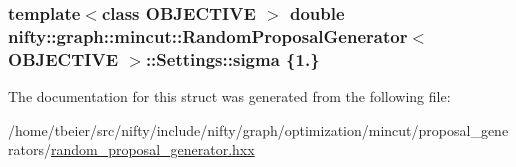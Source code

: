 \subsubsection[{sigma}]{\setlength{\rightskip}{0pt plus 5cm}template$<$class O\+B\+J\+E\+C\+T\+I\+V\+E $>$ double {\bf nifty\+::graph\+::mincut\+::\+Random\+Proposal\+Generator}$<$ O\+B\+J\+E\+C\+T\+I\+V\+E $>$\+::Settings\+::sigma \{1.\}}\label{structnifty_1_1graph_1_1mincut_1_1RandomProposalGenerator_1_1Settings_a457e00b5b4127dea774c5579b7a6ee96}


The documentation for this struct was generated from the following file\+:\begin{DoxyCompactItemize}
\item 
/home/tbeier/src/nifty/include/nifty/graph/optimization/mincut/proposal\+\_\+generators/\hyperlink{random__proposal__generator_8hxx}{random\+\_\+proposal\+\_\+generator.\+hxx}\end{DoxyCompactItemize}
